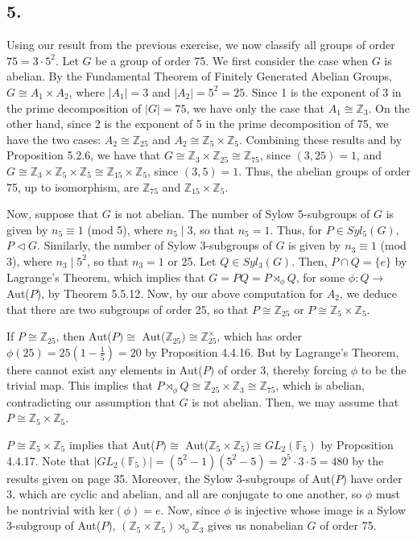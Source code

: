 \subsection*{5.}
Using our result from the previous exercise, we now classify all groups of order $75 = 3\cdot5^2$. Let $G$ be a group of order 75. We first consider the case when $G$ is abelian. By the Fundamental Theorem of Finitely Generated Abelian Groups, $G \cong A_1 \times A_2$, where $|A_1| = 3$ and $|A_2| = 5^2 = 25$. Since 1 is the exponent of 3 in the prime decomposition of $|G|=75$, we have only the case that $A_1 \cong \mathbb{Z}_3$. On the other hand, since 2 is the exponent of 5 in the prime decomposition of 75, we have the two cases: $A_2 \cong \mathbb{Z}_{25}$ and $A_2 \cong \mathbb{Z}_5\times\mathbb{Z}_5$. Combining these results and by Proposition 5.2.6, we have that $G \cong \mathbb{Z}_3\times\mathbb{Z}_{25} \cong \mathbb{Z}_{75}$, since $(3,25)=1$, and $G \cong \mathbb{Z}_3 \times \mathbb{Z}_5 \times \mathbb{Z}_5 \cong \mathbb{Z}_{15}\times\mathbb{Z}_5$, since $(3,5)=1$. Thus, the abelian groups of order 75, up to isomorphism, are $\mathbb{Z}_{75}$ and $\mathbb{Z}_{15}\times\mathbb{Z}_5$.


Now, suppose that $G$ is not abelian. The number of Sylow 5-subgroups of $G$ is given by $n_5 \equiv 1$ (mod 5), where $n_5 \mid 3$, so that $n_5 = 1$. Thus, for $P \in Syl_5(G)$, $P \triangleleft G$. Similarly, the number of Sylow 3-subgroups of $G$ is given by $n_3 \equiv 1$ (mod 3), where $n_3 \mid 5^2$, so that $n_3 = 1$ or 25. Let $Q \in Syl_3(G)$. Then, $P \cap Q = \{e\}$ by Lagrange's Theorem, which implies that $G = PQ = P \rtimes_\phi Q$, for some $\phi:Q \rightarrow$ Aut($P$), by Theorem 5.5.12. Now, by our above computation for $A_2$, we deduce that there are two subgroups of order 25, so that $P \cong \mathbb{Z}_{25}$ or $P \cong \mathbb{Z}_5 \times \mathbb{Z}_5$.

If $P \cong \mathbb{Z}_{25}$, then Aut($P) \cong$ Aut($\mathbb{Z}_{25}) \cong \mathbb{Z}_{25}^\times$, which has order $\phi(25) = 25(1-\frac{1}{5}) = 20$ by Proposition 4.4.16. But by Lagrange's Theorem, there cannot exist any elements in Aut($P)$ of order 3, thereby forcing $\phi$ to be the trivial map. This implies that $P \rtimes_\phi Q \cong \mathbb{Z}_{25}\times\mathbb{Z}_3 \cong\mathbb{Z}_{75}$, which is abelian, contradicting our assumption that $G$ is not abelian. Then, we may assume that $P \cong \mathbb{Z}_5 \times \mathbb{Z}_5$.

$P \cong \mathbb{Z}_5 \times \mathbb{Z}_5$ implies that Aut($P) \cong$ Aut($\mathbb{Z}_5 \times \mathbb{Z}_5) \cong GL_2(\mathbb{F}_5)$ by Proposition 4.4.17. Note that $|GL_2(\mathbb{F}_5)| = (5^2-1)(5^2-5) = 2^5\cdot3\cdot5 = 480$ by the results given on page 35. Moreover, the Sylow 3-subgroups of Aut($P$) have order 3, which are cyclic and abelian, and all are conjugate to one another, so $\phi$ must be nontrivial with ker$(\phi) = e$. Now, since $\phi$ is injective whose image is a Sylow 3-subgroup of Aut($P$), $(\mathbb{Z}_{5}\times\mathbb{Z}_5) \rtimes_\phi \mathbb{Z}_3$ gives us nonabelian $G$ of order 75.